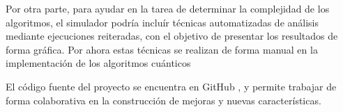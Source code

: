 Por otra parte, para ayudar en la tarea de determinar la complejidad de los 
algoritmos, el simulador podría incluír técnicas automatizadas de análisis 
mediante ejecuciones reiteradas, con el objetivo de presentar los resultados de 
forma gráfica. Por ahora estas técnicas se realizan de forma manual en la 
implementación de los algoritmos cuánticos

El código fuente del proyecto se encuentra en GitHub \cite{pyqsim}, y permite 
trabajar de forma colaborativa en la construcción de mejoras y nuevas 
características.
